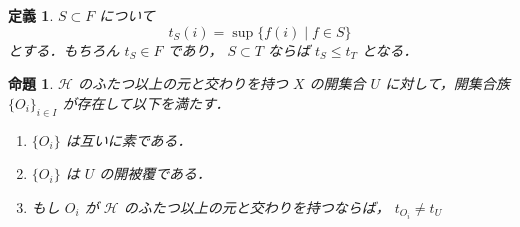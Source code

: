 \documentclass[leqno, 12pt]{ltjsarticle}
\newtheorem{prop}[thm]{命題}
\newtheorem{df}[thm]{定義}
\begin{document}
\begin{df}
$S\subset F$
について
\[
t_{S}(i)=\sup\{f(i) \mid f\in S\}
\]
とする．もちろん
$t_{S}\in F$
であり，
$S\subset T$
ならば
$t_{S}\le t_{T}$
となる．
\end{df}


\begin{prop}\label{prop:ucover}
$\mathcal{H}$
のふたつ以上の元と交わりを持つ
$X$
の開集合
$U$
に対して，開集合族
$\{O_{i}\}_{i\in I}$
が存在して以下を満たす．
\begin{enumerate}[label=\textup{(\arabic*)}]
\item
$\{O_{i}\}$
は互いに素である．
\item
$\{O_{i}\}$
は
$U$
の開被覆である．
\item もし
$O_{i}$
が
$\mathcal{H}$
のふたつ以上の元と交わりを持つならば，
$t_{O_{i}}\neq t_{U}$
\end{enumerate}
\end{prop}
\end{document}
